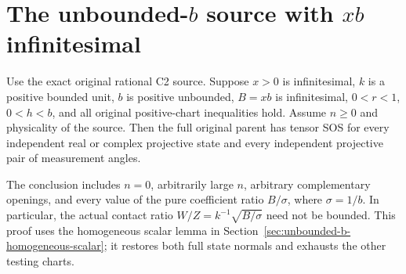 \section[The unbounded-b source with xb infinitesimal]{The unbounded-$b$ source with $xb$ infinitesimal}
\label{sec:c2-unbounded-b-small-B}

\begin{theorem}
Use the exact original rational C2 source.  Suppose $x>0$ is
infinitesimal, $k$ is a positive bounded unit, $b$ is positive
unbounded, $B=xb$ is infinitesimal, $0<r<1$, $0<h<b$, and all
original positive-chart inequalities hold.  Assume $n\geq0$ and
physicality of the source.  Then the full original parent has tensor
SOS for every independent real or complex projective state and
every independent projective pair of measurement angles.
\end{theorem}

The conclusion includes $n=0$, arbitrarily large $n$, arbitrary
complementary openings, and every value of the pure coefficient
ratio $B/\sigma$, where $\sigma=1/b$.  In particular, the actual
contact ratio $W/Z=k^{-1}\sqrt{B/\sigma}$ need not be bounded.
This proof uses the homogeneous scalar lemma in
Section~\ref{sec:unbounded-b-homogeneous-scalar}; it restores both
full state normals and exhausts the other testing charts.

